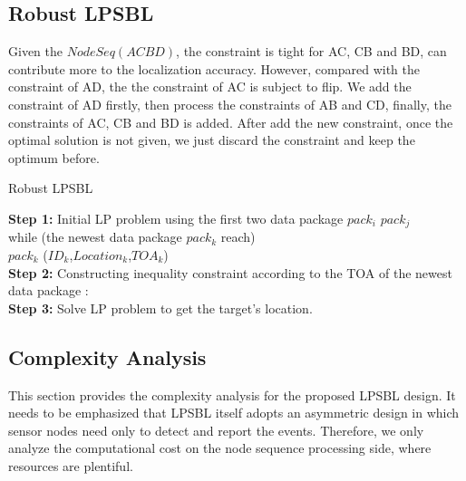  
 \subsection{Robust LPSBL}
 
Given the $NodeSeq (A C B D)$, the constraint is tight for AC, CB and BD, can contribute more to the localization accuracy. 
 However, compared with the constraint of AD, the the constraint of AC is subject to flip.
 We add the constraint of AD firstly, then process the constraints of AB and CD,  finally, the constraints of AC, CB and BD is added.
 After add the new constraint, once the optimal solution is not given, we just discard the constraint and keep the optimum before.


 
\begin{algorithm}
\caption{Robust LPSBL}
 
 \textbf{Step 1:}  Initial LP problem using the first two data package $pack_i$ $pack_j$ \\
          while (the newest data package $pack_k$ reach)\\		 
		   $pack_k$ ($ID_k$,$Location_k$,$TOA_k$)\\
\textbf{Step 2:}  Constructing inequality constraint according to the TOA of the newest data package : \\ 

\textbf{Step 3:} Solve LP problem to get the target's location.\\
       
 
 \end{algorithm}
 
\subsection{Complexity Analysis}
This section provides the complexity analysis for the proposed
LPSBL design. It needs to be emphasized that
LPSBL itself adopts an asymmetric design in which sensor
nodes need only to detect and report the events. Therefore,
we only analyze the computational cost on the node sequence
processing side, where resources are plentiful.

